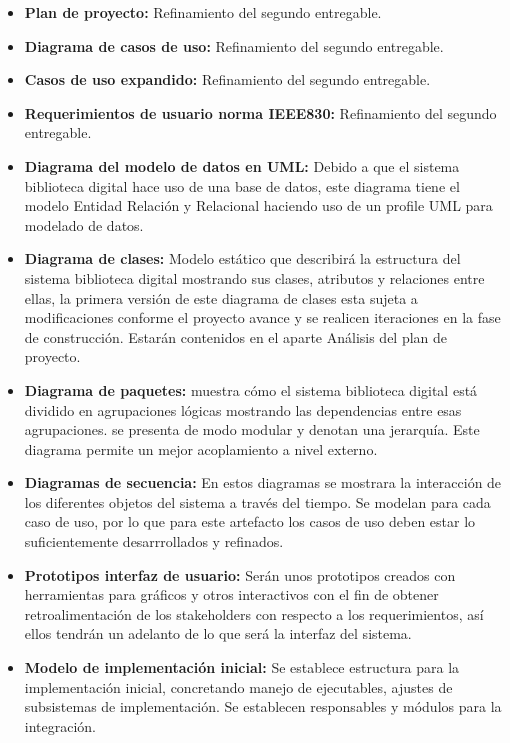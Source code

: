                 \begin{itemize}
                \item\textbf{Plan de proyecto:} Refinamiento del segundo entregable.
                \item\textbf{Diagrama de casos de uso:} Refinamiento del segundo entregable.
                \item\textbf{Casos de uso expandido:} Refinamiento del segundo entregable.
                \item\textbf{Requerimientos de usuario norma IEEE830:} Refinamiento del segundo
                entregable.
                \item\textbf{Diagrama del modelo de datos en UML:} Debido a que el sistema
                biblioteca digital hace uso de una base de datos, este diagrama tiene el modelo
                Entidad Relación y Relacional haciendo uso de un profile UML para modelado de
                datos.
                \item\textbf{Diagrama de clases:} Modelo estático que describirá la estructura del
                sistema biblioteca digital mostrando sus clases, atributos y relaciones entre
                ellas, la primera versión de este diagrama de clases esta sujeta a modificaciones
                conforme el proyecto avance y se realicen iteraciones en la fase de construcción.
                Estarán contenidos en el aparte Análisis del plan de proyecto.
                \item\textbf{Diagrama de paquetes:} muestra cómo el sistema biblioteca digital está
                dividido en agrupaciones lógicas mostrando las dependencias entre esas
                agrupaciones. se presenta de modo modular y denotan una jerarquía. Este diagrama
                permite un mejor acoplamiento a nivel externo.
                \item\textbf{Diagramas de secuencia:} En estos diagramas se mostrara la interacción
                de los diferentes objetos del sistema a través del tiempo. Se modelan para cada
                caso de uso, por lo que para este artefacto los casos de uso deben estar lo
                suficientemente desarrrollados y refinados.
                \item\textbf{Prototipos interfaz de usuario:} Serán unos prototipos creados con
                herramientas para gráficos y otros interactivos con el fin de obtener
                retroalimentación de los stakeholders con respecto a los requerimientos, así ellos
                tendrán un adelanto de lo que será la interfaz del sistema.
                \item\textbf{Modelo de implementación inicial:} Se establece estructura para la
                implementación inicial, concretando manejo de ejecutables, ajustes de subsistemas
                de implementación. Se establecen responsables y módulos para la integración.
                \end{itemize}
                
